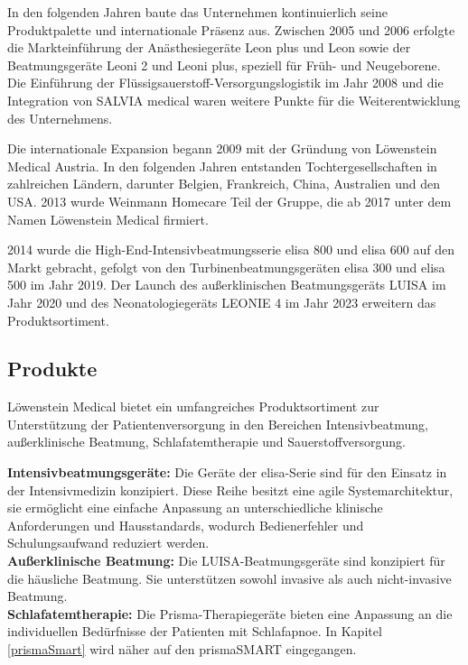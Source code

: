 \documentclass[a4paper, 12pt]{article}
\begin{document}
In den folgenden Jahren baute das Unternehmen kontinuierlich seine Produktpalette und internationale Präsenz aus. Zwischen 2005 und 2006 erfolgte die Markteinführung der Anästhesiegeräte Leon plus und Leon sowie der Beatmungsgeräte Leoni 2 und Leoni plus, speziell für Früh- und Neugeborene. Die Einführung der Flüssigsauerstoff-Versorgungslogistik im Jahr 2008 und die Integration von SALVIA medical waren weitere Punkte für die Weiterentwicklung des Unternehmens.

Die internationale Expansion begann 2009 mit der Gründung von Löwenstein Medical Austria. In den folgenden Jahren entstanden Tochtergesellschaften in zahlreichen Ländern, darunter Belgien, Frankreich, China, Australien und den USA. 2013 wurde Weinmann Homecare Teil der Gruppe, die ab 2017 unter dem Namen Löwenstein Medical firmiert.

2014 wurde die High-End-Intensivbeatmungsserie elisa 800 und elisa 600 auf den Markt gebracht, gefolgt von den Turbinenbeatmungsgeräten elisa 300 und elisa 500 im Jahr 2019. Der Launch des außerklinischen Beatmungsgeräts LUISA im Jahr 2020 und des Neonatologiegeräts LEONIE 4 im Jahr 2023 erweitern das Produktsortiment. \cite{loewenstein}


\subsection{Produkte}\label{products} 
Löwenstein Medical bietet ein umfangreiches Produktsortiment zur Unterstützung der Patientenversorgung in den Bereichen Intensivbeatmung, außerklinische Beatmung, Schlafatemtherapie und Sauerstoffversorgung. 

\textbf{Intensivbeatmungsgeräte:} Die Geräte der elisa-Serie sind für den Einsatz in der Intensivmedizin konzipiert. Diese Reihe besitzt eine agile Systemarchitektur, sie ermöglicht eine einfache Anpassung an unterschiedliche klinische Anforderungen und Hausstandards, wodurch Bedienerfehler und Schulungsaufwand reduziert werden. \\

\textbf{Außerklinische Beatmung:} Die LUISA-Beatmungsgeräte sind konzipiert für die häusliche Beatmung. Sie unterstützen sowohl invasive als auch nicht-invasive Beatmung. \\

\textbf{Schlafatemtherapie:} Die Prisma-Therapiegeräte bieten eine Anpassung an die individuellen Bedürfnisse der Patienten mit Schlafapnoe. In Kapitel \ref{prismaSmart} wird näher auf den prismaSMART eingegangen. \\
\end{document}
